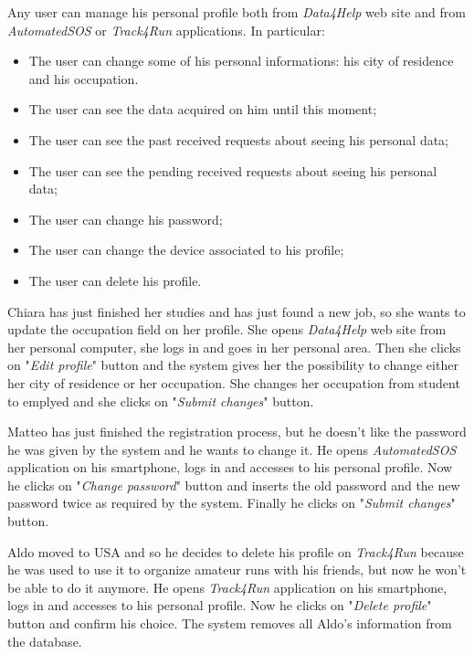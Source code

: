 Any user can manage his personal profile both from \textit{Data4Help} web site and from \textit{AutomatedSOS} or \textit{Track4Run} applications. In particular:
\begin{itemize}
  \item The user can change some of his personal informations: his city of residence and his occupation.
  \item The user can see the data acquired on him until this moment;
  \item The user can see the past received requests about seeing his personal data;
  \item The user can see the pending received requests about seeing his personal data;
  \item The user can change his password;
  \item The user can change the device associated to his profile;
  \item The user can delete his profile.
\end{itemize}

Chiara has just finished her studies and has just found a new job, so she wants to update the occupation field on her profile. She opens \textit{Data4Help} web site from her personal computer, she logs in and goes in her personal area. Then she clicks on "\textit{Edit profile}" button and the system gives her the possibility to change either her city of residence or her occupation. She changes her occupation from student to emplyed and she clicks on "\textit{Submit changes}" button.

Matteo has just finished the registration process, but he doesn't like the password he was given by the system and he wants to change it. He opens \textit{AutomatedSOS} application on his smartphone, logs in and accesses to his personal profile. Now he clicks on "\textit{Change password}" button and inserts the old password and the new password twice as required by the system. Finally he clicks on "\textit{Submit changes}" button.

Aldo moved to USA and so he decides to delete his profile on \textit{Track4Run} because he was used to use it to organize amateur runs with his friends, but now he won't be able to do it anymore. He opens \textit{Track4Run} application on his smartphone, logs in and accesses to his personal profile. Now he clicks on "\textit{Delete profile}" button and confirm his choice. The system removes all Aldo's information from the database.


